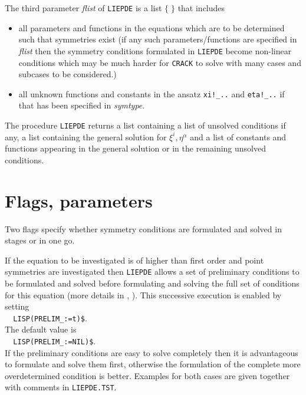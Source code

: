 \documentclass[12pt]{article}
\begin{document}
\noindent The third parameter {\it flist} of {\tt LIEPDE} is a list $\{\;\}$ 
that includes
\begin{itemize}
\item all parameters and functions in the equations which are to
      be determined such that symmetries exist (if any such 
      parameters/functions are 
      specified in {\it flist} then the symmetry conditions 
      formulated in {\tt LIEPDE}
      become non-linear conditions which may be much harder for
      {\tt CRACK} to solve with many cases and subcases to be considered.)
\item all unknown functions and constants in the ansatz 
      \verb+xi!_..+ and \verb+eta!_..+
      if that has been specified in {\it symtype}.
\end{itemize}
The procedure {\tt LIEPDE} returns a list containing a list of 
unsolved conditions if any, a list containing the general solution for 
$\xi^i, \eta^{\alpha}$ and a list of constants and functions appearing 
in the general solution or in the remaining unsolved conditions.

\section{Flags, parameters}
Two flags specify whether symmetry conditions are formulated 
and solved in stages or in one go. 

If the equation to be investigated is of higher than first order 
and point symmetries are investigated then {\tt LIEPDE} allows
a set of preliminary conditions 
to be formulated and solved before formulating and
solving the full set of conditions for this equation (more 
details in \cite{Step},
\cite{Wo}). This successive execution is enabled by setting \\
\verb+  LISP(PRELIM_:=t)$+. \\
The default value is \\ 
\verb+  LISP(PRELIM_:=NIL)$+. \\
If the preliminary conditions are easy to solve completely then 
it is advantageous
to formulate and solve them first, otherwise the formulation of 
the complete more
overdetermined condition is better. Examples for both cases are 
given together with comments in {\tt LIEPDE.TST}.
\end{document}
